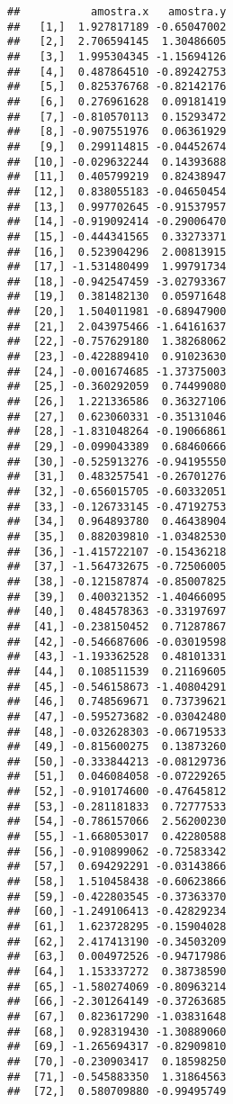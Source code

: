 \documentclass[
]{book}
\begin{document}
\begin{verbatim}
##           amostra.x   amostra.y
##   [1,]  1.927817189 -0.65047002
##   [2,]  2.706594145  1.30486605
##   [3,]  1.995304345 -1.15694126
##   [4,]  0.487864510 -0.89242753
##   [5,]  0.825376768 -0.82142176
##   [6,]  0.276961628  0.09181419
##   [7,] -0.810570113  0.15293472
##   [8,] -0.907551976  0.06361929
##   [9,]  0.299114815 -0.04452674
##  [10,] -0.029632244  0.14393688
##  [11,]  0.405799219  0.82438947
##  [12,]  0.838055183 -0.04650454
##  [13,]  0.997702645 -0.91537957
##  [14,] -0.919092414 -0.29006470
##  [15,] -0.444341565  0.33273371
##  [16,]  0.523904296  2.00813915
##  [17,] -1.531480499  1.99791734
##  [18,] -0.942547459 -3.02793367
##  [19,]  0.381482130  0.05971648
##  [20,]  1.504011981 -0.68947900
##  [21,]  2.043975466 -1.64161637
##  [22,] -0.757629180  1.38268062
##  [23,] -0.422889410  0.91023630
##  [24,] -0.001674685 -1.37375003
##  [25,] -0.360292059  0.74499080
##  [26,]  1.221336586  0.36327106
##  [27,]  0.623060331 -0.35131046
##  [28,] -1.831048264 -0.19066861
##  [29,] -0.099043389  0.68460666
##  [30,] -0.525913276 -0.94195550
##  [31,]  0.483257541 -0.26701276
##  [32,] -0.656015705 -0.60332051
##  [33,] -0.126733145 -0.47192753
##  [34,]  0.964893780  0.46438904
##  [35,]  0.882039810 -1.03482530
##  [36,] -1.415722107 -0.15436218
##  [37,] -1.564732675 -0.72506005
##  [38,] -0.121587874 -0.85007825
##  [39,]  0.400321352 -1.40466095
##  [40,]  0.484578363 -0.33197697
##  [41,] -0.238150452  0.71287867
##  [42,] -0.546687606 -0.03019598
##  [43,] -1.193362528  0.48101331
##  [44,]  0.108511539  0.21169605
##  [45,] -0.546158673 -1.40804291
##  [46,]  0.748569671  0.73739621
##  [47,] -0.595273682 -0.03042480
##  [48,] -0.032628303 -0.06719533
##  [49,] -0.815600275  0.13873260
##  [50,] -0.333844213 -0.08129736
##  [51,]  0.046084058 -0.07229265
##  [52,] -0.910174600 -0.47645812
##  [53,] -0.281181833  0.72777533
##  [54,] -0.786157066  2.56200230
##  [55,] -1.668053017  0.42280588
##  [56,] -0.910899062 -0.72583342
##  [57,]  0.694292291 -0.03143866
##  [58,]  1.510458438 -0.60623866
##  [59,] -0.422803545 -0.37363370
##  [60,] -1.249106413 -0.42829234
##  [61,]  1.623728295 -0.15904028
##  [62,]  2.417413190 -0.34503209
##  [63,]  0.004972526 -0.94717986
##  [64,]  1.153337272  0.38738590
##  [65,] -1.580274069 -0.80963214
##  [66,] -2.301264149 -0.37263685
##  [67,]  0.823617290 -1.03831648
##  [68,]  0.928319430 -1.30889060
##  [69,] -1.265694317 -0.82909810
##  [70,] -0.230903417  0.18598250
##  [71,] -0.545883350  1.31864563
##  [72,]  0.580709880 -0.99495749

\end{verbatim}
\end{document}
